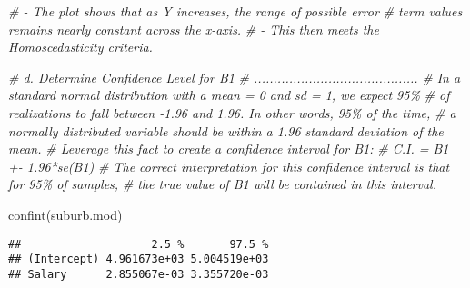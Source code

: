 \documentclass[
]{article}
\newenvironment{Shaded}{\begin{snugshade}}{\end{snugshade}}
\newcommand{\CommentTok}[1]{\textcolor[rgb]{0.56,0.35,0.01}{\textit{#1}}}
\newcommand{\FunctionTok}[1]{\textcolor[rgb]{0.00,0.00,0.00}{#1}}
\newcommand{\NormalTok}[1]{#1}
\begin{document}
\begin{Shaded}
\begin{Highlighting}[]
    \CommentTok{\# {-} The plot shows that as Y increases, the range of possible error }
    \CommentTok{\#   term values remains nearly constant across the x{-}axis.    }
    \CommentTok{\# {-} This then meets the Homoscedasticity criteria.   }


\CommentTok{\# d. Determine Confidence Level for B1}
\CommentTok{\# ..........................................}
\CommentTok{\# In a standard normal distribution with a mean = 0 and sd = 1, we expect 95\% }
\CommentTok{\# of realizations to fall between {-}1.96 and 1.96. In other words, 95\% of the time, }
\CommentTok{\# a normally distributed variable should be within a 1.96 standard deviation of the mean.}
\CommentTok{\# Leverage this fact to create a confidence interval for B1:}
\CommentTok{\#     C.I. = B1 +{-} 1.96*se(B1)}
\CommentTok{\# The correct interpretation for this confidence interval is that for 95\% of samples, }
\CommentTok{\# the true value of B1 will be contained in this interval. }

\FunctionTok{confint}\NormalTok{(suburb.mod)}
\end{Highlighting}
\end{Shaded}

\begin{verbatim}
##                    2.5 %       97.5 %
## (Intercept) 4.961673e+03 5.004519e+03
## Salary      2.855067e-03 3.355720e-03
\end{verbatim}
\end{document}
